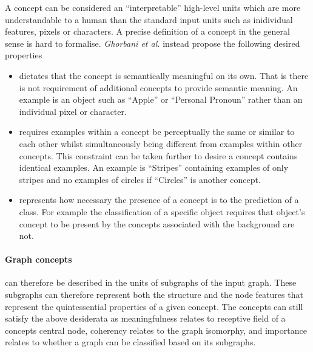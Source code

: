 A concept can be considered an ``interpretable'' high-level units which are more understandable to a human than the standard input units such as inidividual features, pixels or characters.
A precise definition of a concept in the general sense is hard to formalise.
\textit{Ghorbani et al.} instead propose the following desired properties
\begin{itemize}
    \item[]
        dictates that the concept is semantically meaningful on its own.
        That is there is not requirement of additional concepts to provide semantic meaning.
        An example is an object such as ``Apple'' or ``Personal Pronoun'' rather than an individual pixel or character.
    \item[]
        requires examples within a concept be perceptually the same or similar to each other whilst simultaneously being different from examples within other concepts.
        This constraint can be taken further to desire a concept contains identical examples.
        An example is ``Stripes'' containing examples of only stripes and no examples of circles if ``Circles'' is another concept.
    \item[]
        represents how necessary the presence of a concept is to the prediction of a class.
        For example the classification of a specific object requires that object's concept to be present by the concepts associated with the background are not.
\end{itemize}



\paragraph{Graph concepts} can therefore be described in the units of subgraphs of the input graph.
These subgraphs can therefore represent both the structure and the node features that represent the quintessential properties of a given concept.
The concepts can still satisfy the above desiderata as meaningfulness relates to receptive field of a concepts central node, coherency relates to the graph isomorphy, and importance relates to whether a graph can be classified based on its subgraphs.

